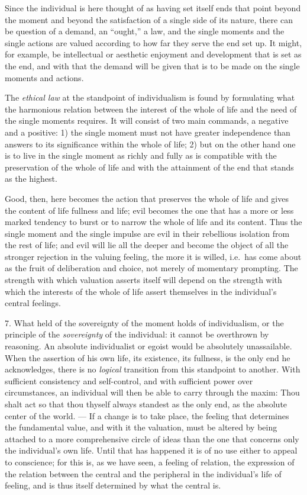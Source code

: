 \documentclass[12pt,a4paper,openany]{book}
\newcommand{\opage}[1]{\marginnote{\footnotesize\textit{[#1]}}}
\begin{document}
Since the individual is here thought of as having set itself ends that point beyond the moment and
beyond the satisfaction of a single side of its nature, there can be question of a demand, an
``ought,'' a law, and the single moments and the single actions are valued according to how far they
serve the end set up. It might, for example, be intellectual or aesthetic enjoyment and development
that is set as the end, and with that the demand will be given that is to be made on the single
moments and actions.

The \textit{ethical law} at the standpoint of individualism is found by formulating what the
harmonious relation between the interest of the whole of life and the need of the single moments
requires. It will consist of two main commands, a negative and a positive: 1) the single moment must
not have greater independence than answers to its significance within the whole of life; 2) but on
the other hand one is to live in the single moment as richly
\opage{35}and fully as is compatible with the preservation of the whole of life and with the attainment of the
end that stands as the highest.

Good, then, here becomes the action that preserves the whole of life and gives the content of life
fullness and life; evil becomes the one that has a more or less marked tendency to burst or to narrow
the whole of life and its content. Thus the single moment and the single impulse are evil in their
rebellious isolation from the rest of life; and evil will lie all the deeper and become the object of
all the stronger rejection in the valuing feeling, the more it is willed, i.e.\ has come about as
the fruit of deliberation and choice, not merely of momentary prompting. The strength with which
valuation asserts itself will depend on the strength with which the interests of the whole of life
assert themselves in the individual's central feelings.

7. What held of the sovereignty of the moment holds of individualism, or the principle of the
\textit{sovereignty} of the individual: it cannot be overthrown by reasoning. An absolute individualist
or egoist would be absolutely unassailable. When the assertion of his own life, its existence, its
fullness, is the only end he acknowledges, there is no \textit{logical} transition from this
standpoint to another. With sufficient consistency and self-control, and with sufficient power over
circumstances, an individual will then be able to carry through the maxim: Thou shalt act so that
thou thyself always standest as the only end, as the absolute center of the world. --- If a change
is to take place, the feeling that determines the fundamental value, and with it the valuation, must
be altered by being attached to a more comprehensive circle of ideas than the one that concerns only
the individual's own life. Until that has happened it is of no use either to appeal to conscience;
for this is, as we have seen, a feeling of relation, the expression of the relation between the
central and the peripheral in the individual's life of feeling, and is thus itself determined by
what the central is.
\end{document}
